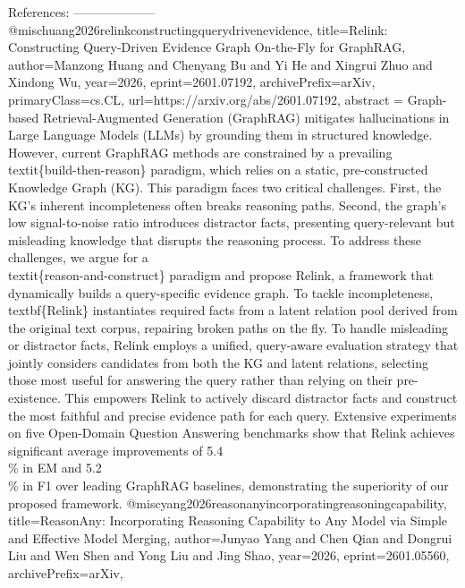         References:
        --------------------
        @misc{huang2026relinkconstructingquerydrivenevidence,
      title={Relink: Constructing Query-Driven Evidence Graph On-the-Fly for GraphRAG}, 
      author={Manzong Huang and Chenyang Bu and Yi He and Xingrui Zhuo and Xindong Wu},
      year={2026},
      eprint={2601.07192},
      archivePrefix={arXiv},
      primaryClass={cs.CL},
      url={https://arxiv.org/abs/2601.07192},
      abstract = {Graph-based Retrieval-Augmented Generation (GraphRAG) mitigates hallucinations in Large Language Models (LLMs) by grounding them in structured knowledge. However, current GraphRAG methods are constrained by a prevailing \\textit\{build-then-reason\} paradigm, which relies on a static, pre-constructed Knowledge Graph (KG). This paradigm faces two critical challenges. First, the KG's inherent incompleteness often breaks reasoning paths. Second, the graph's low signal-to-noise ratio introduces distractor facts, presenting query-relevant but misleading knowledge that disrupts the reasoning process.   To address these challenges, we argue for a \\textit\{reason-and-construct\} paradigm and propose Relink, a framework that dynamically builds a query-specific evidence graph. To tackle incompleteness, \\textbf\{Relink\} instantiates required facts from a latent relation pool derived from the original text corpus, repairing broken paths on the fly. To handle misleading or distractor facts, Relink employs a unified, query-aware evaluation strategy that jointly considers candidates from both the KG and latent relations, selecting those most useful for answering the query rather than relying on their pre-existence. This empowers Relink to actively discard distractor facts and construct the most faithful and precise evidence path for each query.   Extensive experiments on five Open-Domain Question Answering benchmarks show that Relink achieves significant average improvements of 5.4\\\% in EM and 5.2\\\% in F1 over leading GraphRAG baselines, demonstrating the superiority of our proposed framework.}
}@misc{yang2026reasonanyincorporatingreasoningcapability,
      title={ReasonAny: Incorporating Reasoning Capability to Any Model via Simple and Effective Model Merging}, 
      author={Junyao Yang and Chen Qian and Dongrui Liu and Wen Shen and Yong Liu and Jing Shao},
      year={2026},
      eprint={2601.05560},
      archivePrefix={arXiv},
}
